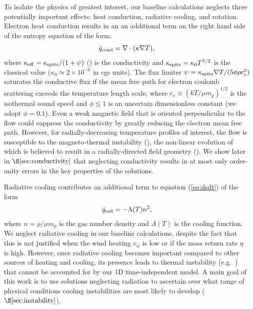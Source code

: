 \documentclass[usenatbib,fleqn]{mn2e}
\newcommand{\vwO}{v_{w}}
\begin{document}
To isolate the physics of greatest interest, our baseline calculations neglects three potentially important effects: heat conduction, radiative cooling, and rotation.  Electron heat conduction results in an an additional term on the right hand side of the entropy equation of the form:  
\begin{equation}
\dot{q}_{\rm cond} = \nabla\cdot(\kappa \nabla T),
\label{eq:qdotcond}
 \end{equation}
where $\kappa_{\rm
  eff}=\kappa_{\rm spitz}/(1+\psi)$ (\citealt{DaltonBalbus:1993a}) is
the conductivity and $\kappa_{\rm spitz} = \kappa_0 T^{5/2}$ is the
classical \citet{Spitzer62} value ($\kappa_0\simeq 2\times 10^{-6}$ in
cgs units).  The flux limiter $\psi = \kappa_{\rm spitz} \nabla
T/(5\phi \rho c_s^3)$ saturates the conductive flux if the mean free
path for electron coulomb scattering exceeds the
temperature length scale, where $c_s \equiv (kT/\mu m_p)^{1/2}$ is the
isothermal sound speed and $\phi \lesssim 1$ is an uncertain
dimensionless constant (we adopt $\phi = 0.1$).  Even a weak magnetic
field that is oriented perpendicular to the flow could suppress the
conductivity by greatly reducing the electron mean free path.  However, for radially-decreasing temperature profiles
of interest, the flow is susceptible to the magneto-thermal instability (\citealt{Balbus01}), the non-linear evolution of which is believed to result in a radially-directed field geometry (\citealt{Parrish&Stone07}).  We show later in $\S\ref{sec:conductivity}$ that neglecting conductivity results in at most only order-unity errors in the key properties of the solutions.

Radiative cooling contributes an additional term to equation (\ref{eq:dsdt}) of the form
\begin{equation}
\dot{q}_{\rm rad} = -\Lambda(T)n^{2},
\label{eq:qdot_rad}
\end{equation}
where $n = \rho/\mu m_p$ is the gas number density and $\Lambda(T)$ is the cooling function.  We neglect radiative cooling in our baseline calculations, despite the fact that this is not justified when the wind heating $\vwO$ is low or if the mass return rate $\eta$ is high.  However, once radiative cooling becomes important compared to other sources of heating and cooling, its presence leads to thermal instability (e.g.~\citealt{McCourt+12}) that cannot be accounted for by our 1D
time-independent model.  A main goal of this work is to use solutions neglecting radiation to ascertain over what range of physical conditions cooling instabilities are most likely to develop ($\S\ref{sec:instability}$).
\end{document}
